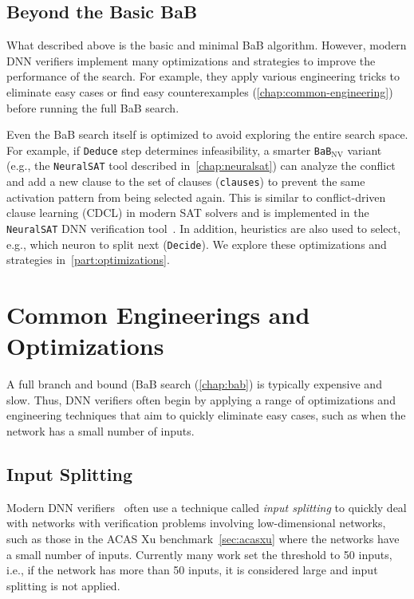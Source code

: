 \documentclass[oneside,11pt,dvipsnames]{book}
\numberwithin{equation}{section}
\theoremstyle{definition}
\theoremstyle{remark}
\newcommand{\functiontextformat}[1]{\textrm{\texttt{#1}}}
\newcommand{\tvn}[1]{\iftoggle{usecomment}{{\color{red}{[TVN]: #1}}}{}}
\newcommand{\prooflang}{\texttt{BaB$_{\text{ProofLang}}$}}
\newcommand{\bab}{\texttt{BaB$_{\text{NV}}$}}
\newcommand{\neuralsat}{\texttt{NeuralSAT}}
\begin{document}
\section{Beyond the Basic BaB} What described above is the basic and minimal BaB algorithm. However, modern DNN verifiers implement many optimizations and strategies to improve the performance of the search. For example, they apply various engineering tricks to eliminate easy cases or find easy counterexamples (\autoref{chap:common-engineering}) before running the full BaB search. 

Even the BaB search itself is optimized to avoid exploring the entire search space. For example, if \functiontextformat{Deduce} step determines infeasibility, a smarter \bab{} variant (e.g., the \neuralsat{} tool described in~\autoref{chap:neuralsat}) can analyze the conflict and add a new clause to the set of clauses (\texttt{clauses}) to prevent the same activation pattern from being selected again. This is similar to conflict-driven clause learning (CDCL) in modern SAT solvers and is implemented in the \neuralsat{} DNN verification tool~\cite{duong2025neuralsat}. In addition, heuristics are also used to select, e.g., which neuron to split next (\functiontextformat{Decide}). We explore these optimizations and strategies in~\autoref{part:optimizations}.





\chapter{Common Engineerings and Optimizations}\label{chap:common-engineering}

A full branch and bound (BaB search (\autoref{chap:bab}) is typically expensive and slow. Thus, DNN verifiers often begin by applying a range of optimizations and engineering techniques that aim to quickly eliminate easy cases, such as when the network has a small number of inputs.

\section{Input Splitting} Modern DNN verifiers~\cite{katz2019marabou,katz2022reluplex,bak2021nnenum,duong2025neuralsat} often use a technique called \emph{input splitting} to quickly deal with networks with verification problems involving low-dimensional networks, such as those in the ACAS Xu benchmark~\autoref{sec:acasxu} where the networks have a small number of inputs. Currently many work set the threshold to 50 inputs, i.e., if the network has more than 50 inputs, it is considered large and input splitting is not applied.
\end{document}
